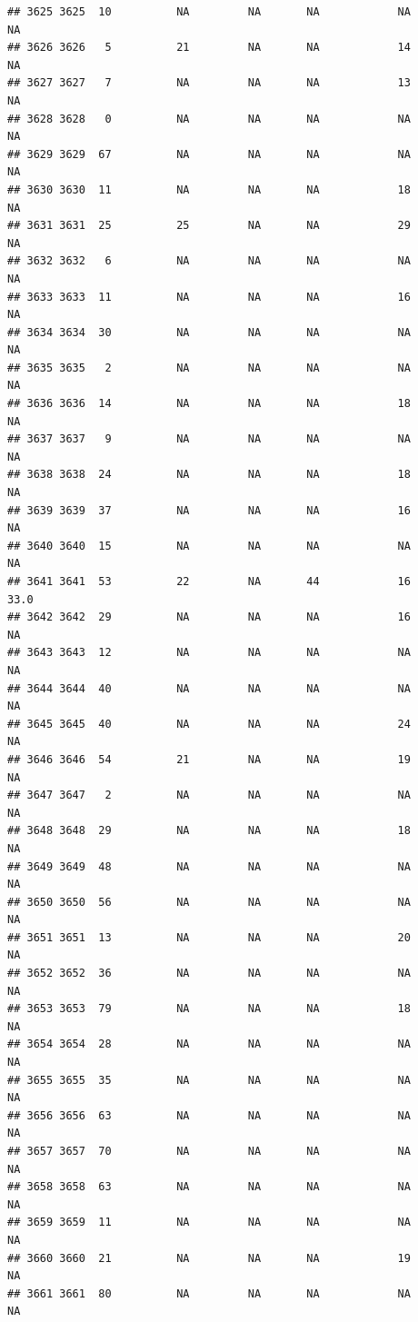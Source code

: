 \documentclass[man]{apa6}
\begin{document}
\begin{verbatim}
## 3625 3625  10          NA         NA       NA            NA       NA
## 3626 3626   5          21         NA       NA            14       NA
## 3627 3627   7          NA         NA       NA            13       NA
## 3628 3628   0          NA         NA       NA            NA       NA
## 3629 3629  67          NA         NA       NA            NA       NA
## 3630 3630  11          NA         NA       NA            18       NA
## 3631 3631  25          25         NA       NA            29       NA
## 3632 3632   6          NA         NA       NA            NA       NA
## 3633 3633  11          NA         NA       NA            16       NA
## 3634 3634  30          NA         NA       NA            NA       NA
## 3635 3635   2          NA         NA       NA            NA       NA
## 3636 3636  14          NA         NA       NA            18       NA
## 3637 3637   9          NA         NA       NA            NA       NA
## 3638 3638  24          NA         NA       NA            18       NA
## 3639 3639  37          NA         NA       NA            16       NA
## 3640 3640  15          NA         NA       NA            NA       NA
## 3641 3641  53          22         NA       44            16     33.0
## 3642 3642  29          NA         NA       NA            16       NA
## 3643 3643  12          NA         NA       NA            NA       NA
## 3644 3644  40          NA         NA       NA            NA       NA
## 3645 3645  40          NA         NA       NA            24       NA
## 3646 3646  54          21         NA       NA            19       NA
## 3647 3647   2          NA         NA       NA            NA       NA
## 3648 3648  29          NA         NA       NA            18       NA
## 3649 3649  48          NA         NA       NA            NA       NA
## 3650 3650  56          NA         NA       NA            NA       NA
## 3651 3651  13          NA         NA       NA            20       NA
## 3652 3652  36          NA         NA       NA            NA       NA
## 3653 3653  79          NA         NA       NA            18       NA
## 3654 3654  28          NA         NA       NA            NA       NA
## 3655 3655  35          NA         NA       NA            NA       NA
## 3656 3656  63          NA         NA       NA            NA       NA
## 3657 3657  70          NA         NA       NA            NA       NA
## 3658 3658  63          NA         NA       NA            NA       NA
## 3659 3659  11          NA         NA       NA            NA       NA
## 3660 3660  21          NA         NA       NA            19       NA
## 3661 3661  80          NA         NA       NA            NA       NA

\end{verbatim}
\end{document}
